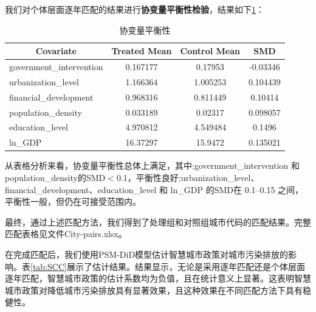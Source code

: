 \documentclass[a4paper,12pt]{article}
\begin{document}
我们对个体层面逐年匹配的结果进行\textbf{协变量平衡性检验}，结果如下\ref{tab:balance}：

\begin{table}[H]
\centering
\begin{tabular}{lccc}
\toprule
\multicolumn{1}{c}{\textbf{Covariate}} & \multicolumn{1}{c}{\textbf{Treated Mean}} & \multicolumn{1}{c}{\textbf{Control Mean}} & \multicolumn{1}{c}{\textbf{SMD}} \\
\midrule
government\_intervention               & 0.167177                                  & 0.17953                                   & -0.03346                         \\

urbanization\_level                    & 1.166364                                  & 1.005253                                  & 0.104439                         \\

financial\_development                 & 0.968316                                  & 0.811449                                  & 0.10414                          \\

population\_density                    & 0.033189                                  & 0.02317                                   & 0.098057                         \\

education\_level                       & 4.970812                                  & 4.549484                                  & 0.1496                           \\

ln\_GDP                                & 16.37297                                  & 15.9472                                   & 0.135021 \\
\bottomrule
\end{tabular}
\caption{协变量平衡性}
\label{tab:balance}
\end{table}

从表格分析来看，协变量平衡性总体上满足，其中:government\_intervention 和 population\_density的SMD$<$0.1，平衡性良好;urbanization\_level、financial\_development、education\_level 和 ln\_GDP 的SMD在 0.1–0.15 之间，平衡性一般，但仍在可接受范围内。

最终，通过上述匹配方法，我们得到了处理组和对照组城市代码的匹配结果。完整匹配表格见文件City-pairs.xlsx。

在完成匹配后，我们使用PSM-DiD模型估计智慧城市政策对城市污染排放的影响。表\ref{tab:SCC}展示了估计结果。结果显示，无论是采用逐年匹配还是个体层面逐年匹配，智慧城市政策的估计系数均为负值，且在统计意义上显著。这表明智慧城市政策对降低城市污染排放具有显著效果，且这种效果在不同匹配方法下具有稳健性。
\end{document}
